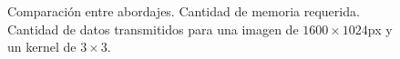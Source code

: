 \begin{figure}[!t]
\centering
{}
\hfil %
\centering
{}
\caption{Comparación entre abordajes. \protect{} Cantidad de memoria
  requerida. \protect{} Cantidad de datos transmitidos para
  una imagen de $1600\times1024$px y un kernel de $3\times3$.}\label{comp}
\end{figure}

